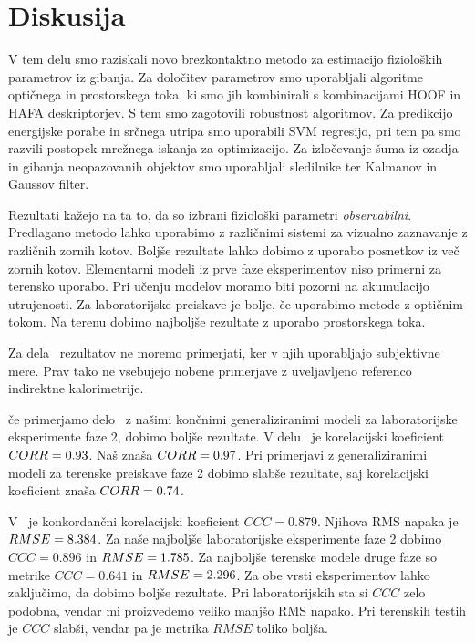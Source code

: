 \chapter{Diskusija}\label{sec:diskusija}
V tem delu smo raziskali novo brezkontaktno metodo za estimacijo fizioloških parametrov iz gibanja. Za določitev parametrov smo uporabljali algoritme optičnega in prostorskega toka, ki smo jih kombinirali s kombinacijami HOOF in HAFA deskriptorjev. S tem smo zagotovili robustnost algoritmov. Za predikcijo energijske porabe in srčnega utripa smo uporabili SVM regresijo, pri tem pa smo razvili \nurbf postopek mrežnega iskanja za optimizacijo. Za izločevanje šuma iz ozadja in gibanja neopazovanih objektov smo uporabljali sledilnike ter Kalmanov in Gaussov filter.

Rezultati kažejo na ta to, da so izbrani fiziološki parametri \emph{observabilni}. Predlagano metodo lahko uporabimo z različnimi sistemi za vizualno zaznavanje z različnih zornih kotov. Boljše rezultate lahko dobimo z uporabo posnetkov iz več zornih kotov. Elementarni modeli iz prve faze eksperimentov niso primerni za terensko uporabo. Pri učenju modelov moramo biti pozorni na akumulacijo utrujenosti. Za laboratorijske preiskave je bolje, če uporabimo metode z optičnim tokom. Na terenu dobimo najboljše rezultate z uporabo prostorskega toka.

Za dela~\cite{peker2004framework,silva2015assessing,osgnach2010energy} rezultatov ne moremo primerjati, ker v njih uporabljajo subjektivne mere. Prav tako ne vsebujejo nobene primerjave z uveljavljeno referenco indirektne kalorimetrije.

če primerjamo delo~\cite{botton2011energy} z našimi končnimi generaliziranimi modeli za laboratorijske eksperimente faze 2, dobimo boljše rezultate. V delu~\cite{botton2011energy} je korelacijski koeficient ${CORR}=0.93$. Naš znaša ${CORR}=0.97$. Pri primerjavi z generaliziranimi modeli za terenske preiskave faze 2 dobimo slabše rezultate, saj korelacijski koeficient znaša ${CORR}=0.74$.

V~\cite{nathan2015estimating} je konkordančni korelacijski koeficient $CCC=0.879$. Njihova RMS napaka je ${RMSE}=8.384$. Za naše najboljše laboratorijske eksperimente faze 2 dobimo $CCC=0.896$ in ${RMSE}=1.785$. Za najboljše terenske modele druge faze so metrike  $CCC=0.641$ in ${RMSE}=2.296$. Za obe vrsti eksperimentov lahko zaključimo, da dobimo boljše rezultate. Pri laboratorijskih sta si $CCC$ zelo podobna, vendar mi proizvedemo veliko manjšo RMS napako. Pri terenskih testih je $CCC$ slabši, vendar pa je metrika $RMSE$ toliko boljša.

